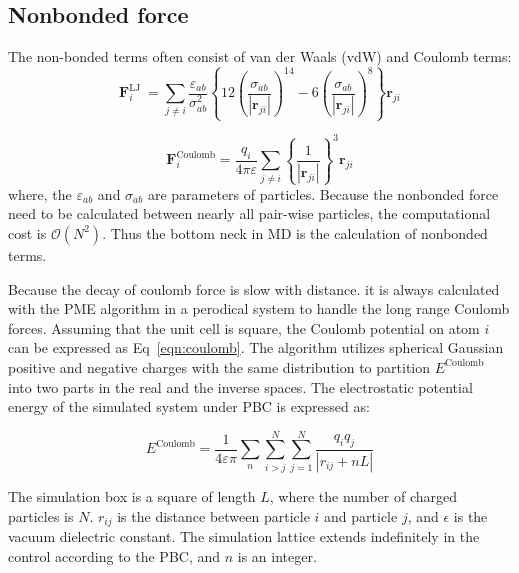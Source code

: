 \documentclass{article}
\begin{document}
\subsection{Nonbonded force}

\noindent
The non-bonded terms often consist of van der Waals (vdW) and Coulomb terms:
\begin{equation}
    \boldsymbol{F}^\mathrm{LJ}_{i}\
    =\sum_{j \neq i} \frac{\varepsilon_{a b}}{\sigma_{a b}^{2}}\left\{12\left(\frac{\sigma_{a b}}{\left|\mathbf{r}_{j i}\right|}\right)^{14}-6\left(\frac{\sigma_{a b}}{\left|\mathbf{r}_{j i}\right|}\right)^{8}\right\} \mathbf{r}_{j i}
\end{equation}
    
\begin{equation}
    \boldsymbol{F}^\mathrm{Coulomb}_{i}=
        \frac{q_{i}}{4 \pi \varepsilon} \sum_{j \neq i}  
        \left\{\frac{1}{\left|\mathbf{r}_{j i}\right|}\right\}^{3}  
        \mathbf{r}_{ji}
        \label{eqn:coulomb}
\end{equation}
where, the $\varepsilon_{a b}$ and $\sigma_{a b}$ are parameters of particles.
Because the nonbonded force need to be calculated between nearly all pair-wise 
particles, the computational cost is $\mathcal{O}(N^2)$.
Thus the bottom neck in MD is the calculation of nonbonded terms.

\noindent
Because the decay of coulomb force is slow with distance. it is always 
calculated with the PME algorithm in a perodical system 
to handle the long range Coulomb forces. 
Assuming that the unit cell is square, the Coulomb potential on atom $i$ can be 
expressed as Eq~\ref{eqn:coulomb}. 
The algorithm utilizes spherical Gaussian positive and negative charges with 
the same distribution to partition $E^\mathrm{Coulomb}$ into two parts in the 
real and the inverse spaces. 
The electrostatic potential energy of the simulated system under PBC is 
expressed as:


\begin{center}
	\begin{equation}
		E^\mathrm{Coulomb}=\frac{1}{4\varepsilon \pi} \sum_{n}^{} \sum_{i>j}^{N} \sum_{j=1}^{N} \frac{q_{i}q_{j} }{\left|r_{ij}+nL\right|} 
	\end{equation}
\end{center}
The simulation box is a square of length $L$, where the number of charged particles is $N$. $r_{ij}$ is the distance between particle $i$ and particle $j$, and $\epsilon$ is the vacuum dielectric constant. 
The simulation lattice extends indefinitely in the control according to the PBC, and $n$ is an integer.
\end{document}
